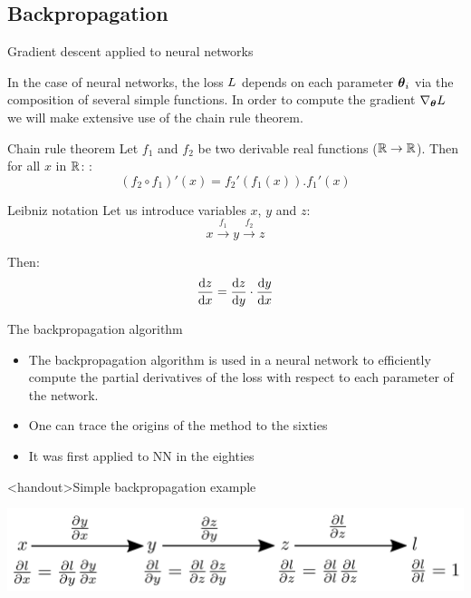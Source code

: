\documentclass[handout,xcolor=pdftex,dvipsnames,table,mathserif]{beamer}
\begin{document}
\subsection{Backpropagation}


\begin{frame}{Gradient descent applied to neural networks}

  In the case of neural networks, the loss $L$ depends on each parameter $\boldsymbol{\theta}_i$ via the composition of several simple functions. In order to compute the gradient $\nabla_{\boldsymbol{\theta}}L$ we will make extensive use of the chain rule theorem.

  \begin{block}{Chain rule theorem}
    Let $f_1$ and $f_2$ be two derivable real functions ($\mathbb{R} \rightarrow \mathbb{R}$). Then for all $x$ in $\mathbb{R}$:   :
    \[
     (f_2 \circ f_1)'(x) = f_2'(f_1(x)).f_1'(x)
    \]
  \end{block}


\begin{block}{Leibniz notation}
  Let us introduce variables $x$, $y$ and $z$:
  \[x \xrightarrow{f_1} y \xrightarrow{f_2} z\]

  Then:
  \[\dv{z}{x} = \dv{z}{y} \cdot \dv{y}{x} \]

\end{block}

\end{frame}


\begin{frame}{The backpropagation algorithm}

  \begin{itemize}
  \item The backpropagation algorithm is used in a neural network to efficiently compute the partial derivatives of the loss with respect to each parameter of the network.
  \item One can trace the origins of the method to the sixties
  \item It was first applied to NN in the eighties \cite{werbos_applications_1982, lecun_procedure_1985}
  \end{itemize}


\end{frame}



\begin{frame}<handout>{Simple backpropagation example}

\includegraphics[width=\textwidth]{bp_simple.png}

\end{frame}
\end{document}
